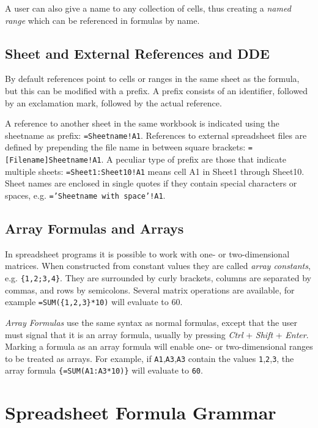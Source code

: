\documentclass[conference]{IEEEtran}
\begin{document}
A user can also give a name to any collection of cells, thus creating a \emph{named range} which can be referenced in formulas by name.

\subsection{Sheet and External References and DDE}
\label{subsection:ExternalRefsDDE}

By default references point to cells or ranges in the same sheet as the formula, but this can be modified with a prefix. A prefix consists of an identifier, followed by an exclamation mark, followed by the actual reference.

A reference to another sheet in the same workbook is indicated using the sheetname as prefix: \texttt{=Sheetname!A1}. References to external spreadsheet files are defined by prepending the file name in between square brackets: \texttt{=[Filename]Sheetname!A1}.
A peculiar type of prefix are those that indicate multiple sheets: \texttt{=Sheet1:Sheet10!A1} means cell A1 in Sheet1 through Sheet10.
Sheet names are enclosed in single quotes if they contain special characters or spaces, e.g. \texttt{='Sheetname with space'!A1}. 

\subsection{Array Formulas and Arrays}
\label{sec:arrayformulas}
In spreadsheet programs it is possible to work with one- or two-dimensional matrices. When constructed from constant values they are called \emph{array constants}, e.g. \texttt{\{1,2;3,4\}}.
They are surrounded by curly brackets, columns are separated by commas, and rows by semicolons.
Several matrix operations are available, for example \texttt{=SUM(\{1,2,3\}*10)} will evaluate to 60.

\emph{Array Formulas} use the same syntax as normal formulas, except that the user must signal that it is an array formula, usually by pressing \emph{Ctrl} + \emph{Shift} + \emph{Enter}.
Marking a formula as an array formula will enable one- or two-dimensional ranges to be treated as arrays.
For example, if \texttt{A1},\texttt{A3},\texttt{A3} contain the values \texttt{1},\texttt{2},\texttt{3}, the array formula \texttt{\{=SUM(A1:A3*10)\}} will evaluate to \texttt{60}.

\section{Spreadsheet Formula Grammar}
\label{section:grammar}
\end{document}
